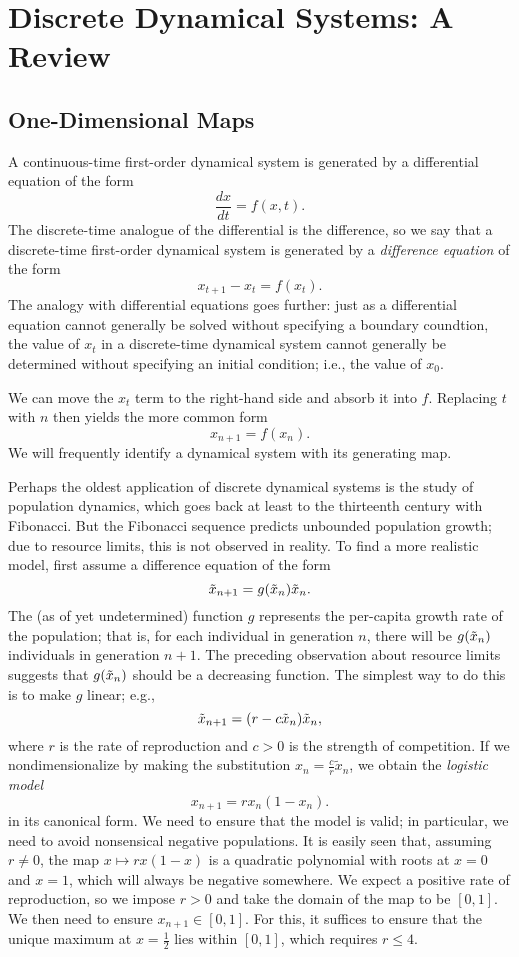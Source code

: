 \documentclass{article}
\theoremstyle{plain}
\theoremstyle{definition}
\DeclarePairedDelimiter{\parensproto}{\lparen}{\rparen}
\newcommand{\parens}{\parensproto*}
\begin{document}
\section{Discrete Dynamical Systems: A Review}

\subsection{One-Dimensional Maps}

A continuous-time first-order dynamical system is generated by a differential equation of the form
\[
  \frac{dx}{dt} = f(x, t).
\]
The discrete-time analogue of the differential is the difference, so we say that a discrete-time first-order dynamical system is generated by a \emph{difference equation} of the form
\[
  x_{t + 1} - x_t = f(x_t).
\]
The analogy with differential equations goes further: just as a differential equation cannot generally be solved without specifying a boundary coundtion, the value of \(x_t\) in a discrete-time dynamical system cannot generally be determined without specifying an initial condition; i.e., the value of \(x_0\).

We can move the \(x_t\) term to the right-hand side and absorb it into \(f\). Replacing \(t\) with \(n\) then yields the more common form
\[
  x_{n + 1} = f(x_n).
\]
We will frequently identify a dynamical system with its generating map.

\begin{example}
  Perhaps the oldest application of discrete dynamical systems is the study of population dynamics, which goes back at least to the thirteenth century with Fibonacci. But the Fibonacci sequence predicts unbounded population growth; due to resource limits, this is not observed in reality. To find a more realistic model, first assume a difference equation of the form
  \[
    \tilde{x}_{n + 1} = g\parens{\tilde{x}_n}\tilde{x}_n.
  \]
  The (as of yet undetermined) function \(g\) represents the per-capita growth rate of the population; that is, for each individual in generation \(n\), there will be \(g\parens{\tilde{x}_n}\) individuals in generation \(n + 1\). The preceding observation about resource limits suggests that \(g\parens{\tilde{x}_n}\) should be a decreasing function. The simplest way to do this is to make \(g\) linear; e.g.,
  \[
    \tilde{x}_{n + 1} = \parens{r - c\tilde{x}_n}\tilde{x}_n,
  \]
  where \(r\) is the rate of reproduction and \(c > 0\) is the strength of competition. If we nondimensionalize by making the substitution \(x_n = \frac{c}{r}\tilde{x}_n\), we obtain the \emph{logistic model}
  \[
    x_{n + 1} = rx_n(1 - x_n).
  \]
  in its canonical form.
  We need to ensure that the model is valid; in particular, we need to avoid nonsensical negative populations. It is easily seen that, assuming \(r \ne 0\), the map \(x \mapsto rx(1 - x)\) is a quadratic polynomial with roots at \(x = 0\) and \(x = 1\), which will always be negative somewhere. We expect a positive rate of reproduction, so we impose \(r > 0\) and take the domain of the map to be \([0, 1]\). We then need to ensure \(x_{n + 1} \in [0, 1]\). For this, it suffices to ensure that the unique maximum at \(x = \frac{1}{2}\) lies within \([0, 1]\), which requires \(r \le 4\).
\end{example}
\end{document}
